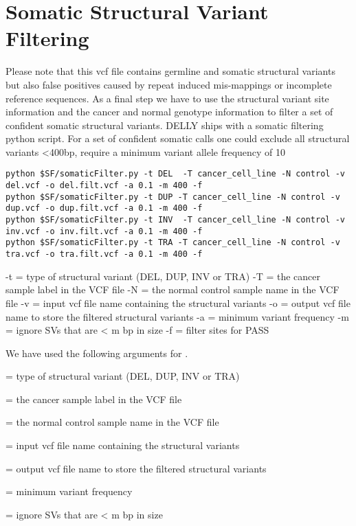 \section{Somatic Structural Variant Filtering}

\begin{information}
Please note that this vcf file contains germline and somatic structural variants but also false positives caused by repeat induced mis-mappings or incomplete reference sequences. As a final step we have to use the structural variant site information and the cancer and normal genotype information to filter a set of confident somatic structural variants. DELLY ships with a somatic filtering python script. For a set of confident somatic calls one could exclude all structural variants \textless400bp, require a minimum variant allele frequency of 10%

\end{information}
\begin{steps}
\begin{lstlisting}
python $SF/somaticFilter.py -t DEL  -T cancer_cell_line -N control -v del.vcf -o del.filt.vcf -a 0.1 -m 400 -f
python $SF/somaticFilter.py -t DUP -T cancer_cell_line -N control -v dup.vcf -o dup.filt.vcf -a 0.1 -m 400 -f
python $SF/somaticFilter.py -t INV  -T cancer_cell_line -N control -v inv.vcf -o inv.filt.vcf -a 0.1 -m 400 -f
python $SF/somaticFilter.py -t TRA -T cancer_cell_line -N control -v tra.vcf -o tra.filt.vcf -a 0.1 -m 400 -f
\end{lstlisting}
\end{steps}

-t = type of structural variant (DEL, DUP, INV or TRA)
-T = the cancer sample label in the VCF file
-N = the normal control sample name in the VCF file
-v = input vcf file name containing the structural variants
-o = output vcf file name to store the filtered structural variants
-a = minimum variant frequency
-m = ignore SVs that are < m bp in size
-f = filter sites for PASS


We have used the following arguments for .
\begin{description}[style=multiline,labelindent=0cm,align=right,leftmargin=\descriptionlabelspace,rightmargin=1.5cm,font=\ttfamily]
  \item[-t] = type of structural variant (DEL, DUP, INV or TRA) 
  \item[-T] = the cancer sample label in the VCF file
  \item[-N] = the normal control sample name in the VCF file
  \item[-v] = input vcf file name containing the structural variants
  \item[-o] = output vcf file name to store the filtered structural variants
  \item[-a] = minimum variant frequency
  \item[-m] = ignore SVs that are < m bp in size 
\end{description}

